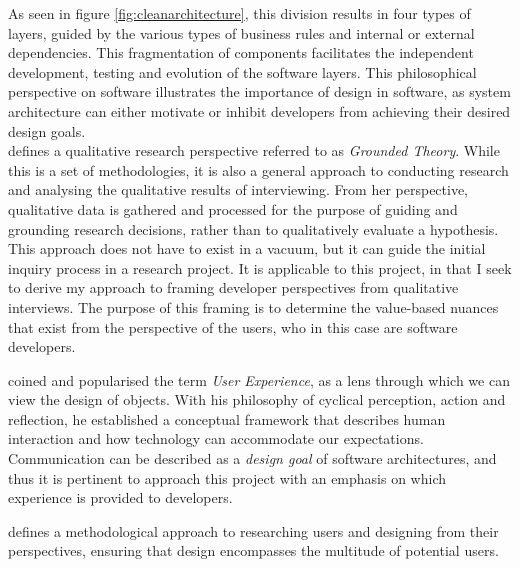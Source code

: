 \documentclass[../report.tex]{subfiles}
\begin{document}
As seen in figure \ref{fig:cleanarchitecture}, this division results in four types of layers, guided by the various types of business rules and internal or external dependencies. This fragmentation of components facilitates the independent development, testing and evolution of the software layers. This philosophical perspective on software illustrates the importance of design in software, as system architecture can either motivate or inhibit developers from achieving their desired design goals. \\


\cite{charmaz2006constructing} defines a qualitative research perspective referred to as \textit{Grounded Theory}. While this is a set of methodologies, it is also a general approach to conducting research and analysing the qualitative results of interviewing. From her perspective, qualitative data is gathered and processed for the purpose of guiding and grounding research decisions, rather than to qualitatively evaluate a hypothesis. This approach does not have to exist in a vacuum, but it can guide the initial inquiry process in a research project. It is applicable to this project, in that I seek to derive my approach to framing developer perspectives from qualitative interviews. The purpose of this framing is to determine the value-based nuances that exist from the perspective of the users, who in this case are software developers.

\cite{norman2013design} coined and popularised the term \textit{User Experience}, as a lens through which we can view the design of objects. With his philosophy of cyclical perception, action and reflection, he established a conceptual framework that describes human interaction and how technology can accommodate our expectations. Communication can be described as a \textit{design goal} of software architectures, and thus it is pertinent to approach this project with an emphasis on which experience is provided to developers.

\cite{buley2013user} defines a methodological approach to researching users and designing from their perspectives, ensuring that design encompasses the multitude of potential users.
\end{document}
